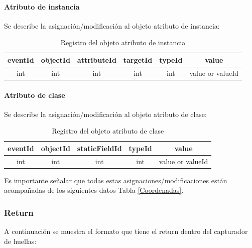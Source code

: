 \documentclass[12pt,legalpaper]{report}
\begin{document}
				\paragraph{Atributo de instancia}

Se describe la asignación/modificación al objeto atributo de instancia:\\

\begin{table}[!h]
\begin{center}
\begin{tabular}{| c | c | c | c | c | c |}
\hline
\rowcolor[gray]{0.9}eventId & objectId & attributeId & targetId & typeId & value\\
\hline
int & int & int & int & int & value or valueId\footnotemark[1]\\
\hline
\end{tabular}
\caption{Registro del objeto atributo de instancia} 
\end{center}
\end{table}


				\paragraph{Atributo de clase}

Se describe la asignación/modificación al objeto atributo de clase:\\

\begin{table}[!h]
\begin{center}
\begin{tabular}{| c | c | c | c | c |}
\hline
\rowcolor[gray]{0.9}eventId & objectId & staticFieldId & typeId & value\\
\hline
int & int & int & int & value or valueId\footnotemark[1]\\
\hline
\end{tabular}
\caption{Registro del objeto atributo de clase} 
\end{center}
\end{table}

Es importante señalar que todas estas asignaciones/modificaciones están acompañadas de los siguientes datos Tabla \ref{Coordenadas}.

			\subsubsection{Return}

A continuación se muestra el formato que tiene el return dentro del capturador de huellas:\\
\end{document}
